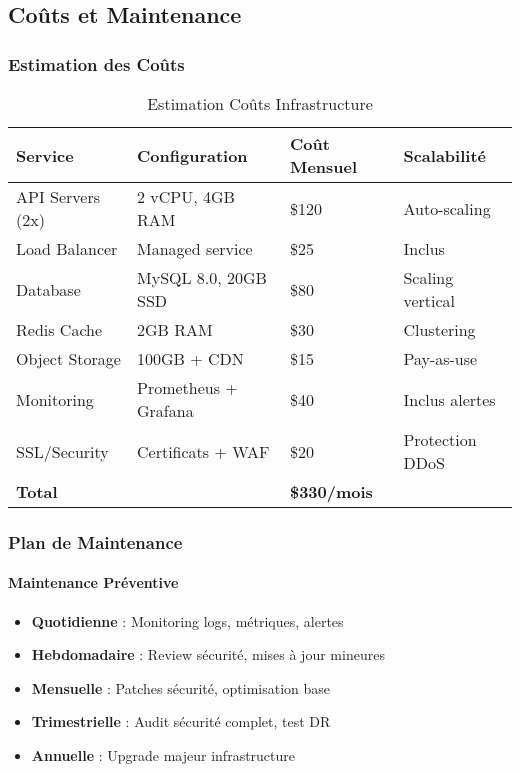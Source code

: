 \subsection{Coûts et Maintenance}

\subsubsection{Estimation des Coûts}

\begin{table}[H]
\centering
\begin{tabular}{|l|l|l|l|}
\hline
\textbf{Service} & \textbf{Configuration} & \textbf{Coût Mensuel} & \textbf{Scalabilité} \\
\hline
API Servers (2x) & 2 vCPU, 4GB RAM & \$120 & Auto-scaling \\
Load Balancer & Managed service & \$25 & Inclus \\
Database & MySQL 8.0, 20GB SSD & \$80 & Scaling vertical \\
Redis Cache & 2GB RAM & \$30 & Clustering \\
Object Storage & 100GB + CDN & \$15 & Pay-as-use \\
Monitoring & Prometheus + Grafana & \$40 & Inclus alertes \\
SSL/Security & Certificats + WAF & \$20 & Protection DDoS \\
\hline
\textbf{Total} & & \textbf{\$330/mois} & \\
\hline
\end{tabular}
\caption{Estimation Coûts Infrastructure}
\end{table}

\subsubsection{Plan de Maintenance}

\paragraph{Maintenance Préventive}
\begin{itemize}
    \item \textbf{Quotidienne} : Monitoring logs, métriques, alertes
    \item \textbf{Hebdomadaire} : Review sécurité, mises à jour mineures
    \item \textbf{Mensuelle} : Patches sécurité, optimisation base
    \item \textbf{Trimestrielle} : Audit sécurité complet, test DR
    \item \textbf{Annuelle} : Upgrade majeur infrastructure
\end{itemize}

